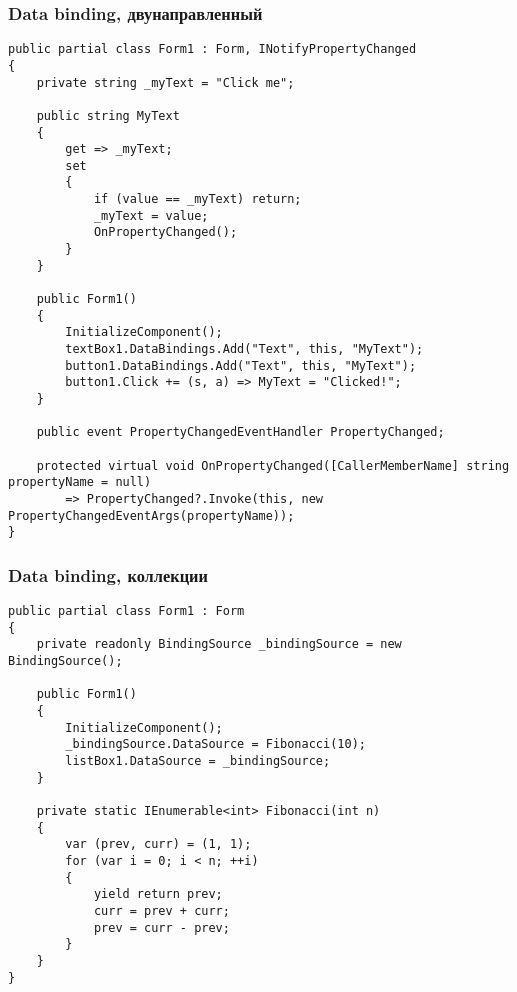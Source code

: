 \documentclass[xetex,mathserif,serif]{beamer}
\begin{document}
	\begin{frame}[fragile]
		\frametitle{Data binding, двунаправленный}
		\begin{ssmall}
			\begin{verbatim}
public partial class Form1 : Form, INotifyPropertyChanged
{
    private string _myText = "Click me";

    public string MyText
    {
        get => _myText;
        set
        {
            if (value == _myText) return;
            _myText = value;
            OnPropertyChanged();
        }
    }

    public Form1()
    {
        InitializeComponent();
        textBox1.DataBindings.Add("Text", this, "MyText");
        button1.DataBindings.Add("Text", this, "MyText");
        button1.Click += (s, a) => MyText = "Clicked!";
    }

    public event PropertyChangedEventHandler PropertyChanged;

    protected virtual void OnPropertyChanged([CallerMemberName] string propertyName = null)
        => PropertyChanged?.Invoke(this, new PropertyChangedEventArgs(propertyName));
}
			\end{verbatim}
		\end{ssmall}
	\end{frame}

	\begin{frame}[fragile]
		\frametitle{Data binding, коллекции}
		\begin{ssmall}
			\begin{verbatim}
public partial class Form1 : Form
{
    private readonly BindingSource _bindingSource = new BindingSource();

    public Form1()
    {
        InitializeComponent();
        _bindingSource.DataSource = Fibonacci(10);
        listBox1.DataSource = _bindingSource;
    }

    private static IEnumerable<int> Fibonacci(int n)
    {
        var (prev, curr) = (1, 1);
        for (var i = 0; i < n; ++i)
        {
            yield return prev;
            curr = prev + curr;
            prev = curr - prev;
        }
    }
}
			\end{verbatim}
		\end{ssmall}
	\end{frame}
\end{document}
